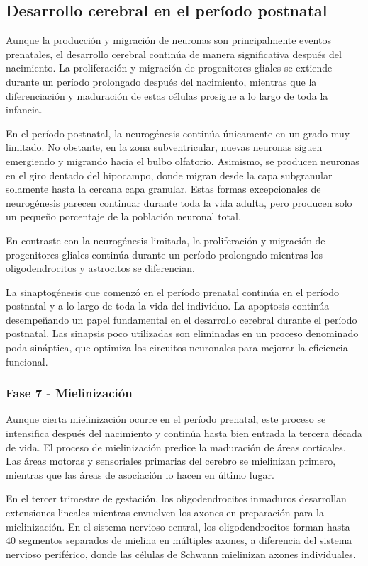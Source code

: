 \documentclass[11pt,letterpaper]{report}
\begin{document}
\subsection{Desarrollo cerebral en el período postnatal}
Aunque la producción y migración de neuronas son principalmente eventos
prenatales, el desarrollo cerebral continúa de manera significativa después del
nacimiento. La proliferación y migración de progenitores gliales se extiende
durante un período prolongado después del nacimiento, mientras que la
diferenciación y maduración de estas células prosigue a lo largo de toda la
infancia. \cite{Stiles2010}

En el período postnatal, la neurogénesis continúa únicamente en un grado muy
limitado. No obstante, en la zona subventricular, nuevas neuronas siguen
emergiendo y migrando hacia el bulbo olfatorio. Asimismo, se producen neuronas
en el giro dentado del hipocampo, donde migran desde la capa subgranular
solamente hasta la cercana capa granular. Estas formas excepcionales de
neurogénesis parecen continuar durante toda la vida adulta, pero producen solo
un pequeño porcentaje de la población neuronal total.
\cite{Stiles2010}

En contraste con la neurogénesis limitada, la proliferación y migración de
progenitores gliales continúa durante un período prolongado mientras los
oligodendrocitos y astrocitos se diferencian. \cite{Stiles2010}

La sinaptogénesis que comenzó en el período prenatal continúa en el período
postnatal y a lo largo de toda la vida del individuo. La apoptosis continúa
desempeñando un papel fundamental en el desarrollo cerebral durante el período
postnatal. Las sinapsis poco utilizadas son eliminadas en un proceso denominado
poda sináptica, que optimiza los circuitos neuronales para mejorar la
eficiencia funcional. \cite{Gibb2018}

\subsubsection{Fase 7 - Mielinización}
Aunque cierta mielinización ocurre en el período prenatal, este proceso se
intensifica después del nacimiento y continúa hasta bien entrada la tercera
década de vida. El proceso de mielinización predice la maduración de áreas
corticales. Las áreas motoras y sensoriales primarias del cerebro se mielinizan
primero, mientras que las áreas de asociación lo hacen en último lugar.
\cite{Gibb2018}

En el tercer trimestre de gestación, los oligodendrocitos inmaduros desarrollan
extensiones lineales mientras envuelven los axones en preparación para la
mielinización. En el sistema nervioso central, los oligodendrocitos forman
hasta 40 segmentos separados de mielina en múltiples axones, a diferencia del
sistema nervioso periférico, donde las células de Schwann mielinizan axones
individuales. \cite{Polin124}
\end{document}
